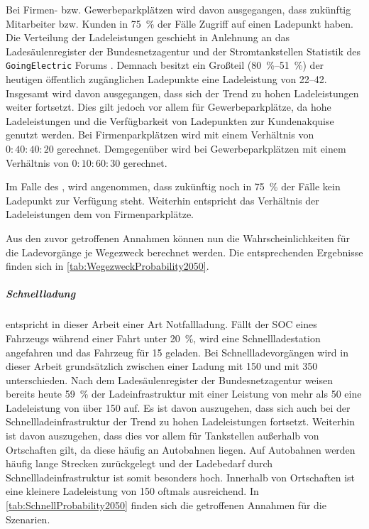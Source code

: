 Bei Firmen- bzw. Gewerbeparkplätzen wird davon ausgegangen, dass zukünftig Mitarbeiter bzw. Kunden in \SI{75}{\percent} der Fälle Zugriff auf einen Ladepunkt haben.
Die Verteilung der Ladeleistungen geschieht in Anlehnung an das Ladesäulenregister der Bundesnetzagentur \cite[][Stand: ]{BundesnetzagenturElektrizitaet2020} und der Stromtankstellen Statistik des \texttt{GoingElectric} Forums \cite[][Stand: ]{Weemaes2020}.
Demnach besitzt ein Großteil (\SIrange[range-phrase=~bzw.~]{80}{51}{\percent}) der heutigen öffentlich zugänglichen Ladepunkte eine Ladeleistung von \SIrange{22}{42}{\kw}.
Insgesamt wird davon ausgegangen, dass sich der Trend zu hohen Ladeleistungen weiter fortsetzt.
Dies gilt jedoch vor allem für Gewerbeparkplätze, da hohe Ladeleistungen und die Verfügbarkeit von Ladepunkten zur Kundenakquise genutzt werden.
Bei Firmenparkplätzen wird mit einem Verhältnis von \(0:40:40:20\) gerechnet.
Demgegenüber wird bei Gewerbeparkplätzen mit einem Verhältnis von \(0:10:60:30\) gerechnet.\medskip

Im Falle des \UCs \Straszenranddot, wird angenommen, dass zukünftig noch in \SI{75}{\percent} der Fälle kein Ladepunkt zur Verfügung steht.
Weiterhin entspricht das Verhältnis der Ladeleistungen dem von Firmenparkplätze.\medskip

Aus den zuvor getroffenen Annahmen können nun die Wahrscheinlichkeiten für die Ladevorgänge je Wegezweck berechnet werden.
Die entsprechenden Ergebnisse finden sich in \autoref{tab:WegezweckProbability2050}.



\subparagraph{Schnellladung} entspricht in dieser Arbeit einer Art Notfallladung.
Fällt der \gls{SOC} eines Fahrzeugs während einer Fahrt unter \SI{20}{\percent}, wird eine Schnellladestation angefahren und das Fahrzeug für \SI{15}{\Minuten} geladen.
Bei Schnellladevorgängen wird in dieser Arbeit grundsätzlich zwischen einer Ladung mit \SI{150}{\kw} und mit \SI{350}{\kw} unterschieden.
Nach dem Ladesäulenregister der Bundesnetzagentur \cite[][Stand: ]{BundesnetzagenturElektrizitaet2020} weisen bereits heute \SI{59}{\percent} der Ladeinfrastruktur mit einer Leistung von mehr als \SI{50}{\kw} eine Ladeleistung von über \SI{150}{\kw} auf.
Es ist davon auszugehen, dass sich auch bei der Schnellladeinfrastruktur der Trend zu hohen Ladeleistungen fortsetzt.
Weiterhin ist davon auszugehen, dass dies vor allem für Tankstellen außerhalb von Ortschaften gilt, da diese häufig an Autobahnen liegen.
Auf Autobahnen werden häufig lange Strecken zurückgelegt und der Ladebedarf durch Schnellladeinfrastruktur ist somit besonders hoch.
Innerhalb von Ortschaften ist eine kleinere Ladeleistung von \SI{150}{\kw} oftmals ausreichend.
In \autoref{tab:SchnellProbability2050} finden sich die getroffenen Annahmen für die Szenarien.

